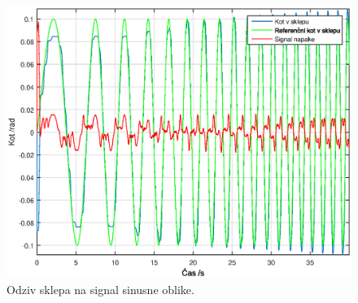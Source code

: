 \begin{figure}
	\centering
	\includegraphics[scale=0.5]{./Slike/torque_follow_sine.eps}
	\caption{Odziv sklepa na signal sinusne oblike.}
	\label{fig:torque_follow_sine}
\end{figure}
